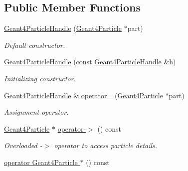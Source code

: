 \subsection*{Public Member Functions}
\begin{DoxyCompactItemize}
\item 
\hyperlink{class_d_d4hep_1_1_simulation_1_1_geant4_particle_handle_aae0f6cff704f2f70a13941b9d9d2b590}{Geant4ParticleHandle} (\hyperlink{class_d_d4hep_1_1_simulation_1_1_geant4_particle}{Geant4Particle} $\ast$part)
\begin{DoxyCompactList}\small\item\em Default constructor. \item\end{DoxyCompactList}\item 
\hyperlink{class_d_d4hep_1_1_simulation_1_1_geant4_particle_handle_a8e62699ff44968d5f8b9926a5512450f}{Geant4ParticleHandle} (const \hyperlink{class_d_d4hep_1_1_simulation_1_1_geant4_particle_handle}{Geant4ParticleHandle} \&h)
\begin{DoxyCompactList}\small\item\em Initializing constructor. \item\end{DoxyCompactList}\item 
\hyperlink{class_d_d4hep_1_1_simulation_1_1_geant4_particle_handle}{Geant4ParticleHandle} \& \hyperlink{class_d_d4hep_1_1_simulation_1_1_geant4_particle_handle_a127942c2338b44ef36f9f8eae2845b63}{operator=} (\hyperlink{class_d_d4hep_1_1_simulation_1_1_geant4_particle}{Geant4Particle} $\ast$part)
\begin{DoxyCompactList}\small\item\em Assignment operator. \item\end{DoxyCompactList}\item 
\hyperlink{class_d_d4hep_1_1_simulation_1_1_geant4_particle}{Geant4Particle} $\ast$ \hyperlink{class_d_d4hep_1_1_simulation_1_1_geant4_particle_handle_adaa32e5e921e192a171b7ca1519a6b5e}{operator-\/$>$} () const 
\begin{DoxyCompactList}\small\item\em Overloaded -\/$>$ operator to access particle details. \item\end{DoxyCompactList}\item 
\hyperlink{class_d_d4hep_1_1_simulation_1_1_geant4_particle_handle_a3db45353903b41b7da55863e51e50f1e}{operator Geant4Particle $\ast$} () const 

\end{DoxyCompactItemize}

